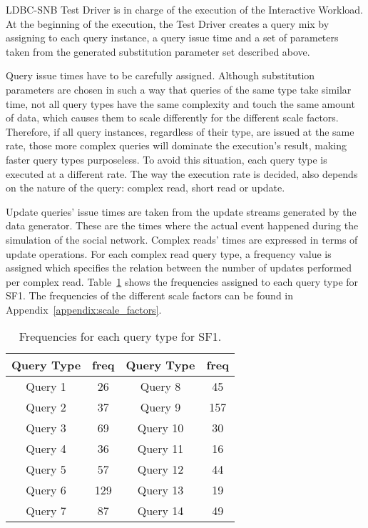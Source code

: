 
LDBC-SNB Test Driver is in charge of the execution of the Interactive Workload.
At the beginning of the execution, the Test Driver creates a query mix by
assigning to each query instance, a query issue time and a set of parameters
taken from the generated substitution parameter set described above.  

Query issue times have to be carefully assigned.  Although substitution
parameters are chosen in such a way that queries of the same type take similar
time, not all query types have the same complexity and touch the same amount of
data, which causes them to scale differently for the different scale factors.
Therefore, if all query instances, regardless of their type, are issued
at the same rate, those more complex queries will dominate the execution's
result, making faster query types purposeless. To avoid this situation, each
query type is executed at a different rate. The way the execution rate is decided,
also depends on the nature of the query: complex read, short read or update.

Update queries' issue times are taken from the update streams generated by the
data generator. These are the times where the actual event happened during the
simulation of the social network. Complex reads' times are expressed in terms
of update operations. For each complex read query type, a frequency value is
assigned which specifies the relation between the number of updates performed
per complex read.  Table~\ref{table:freqs} shows the frequencies assigned to
each query type for SF1. The frequencies of the different scale factors can be
found in Appendix~\ref{appendix:scale_factors}.

\begin{table}[H]
\centering
    \begin{tabular}{|c|c|c|c|}
    \hline
    Query Type & freq & Query Type & freq \\ 
    \hline
    \hline
    Query 1 & 26 & Query 8 & 45 \\ 
    \hline       
    Query 2 & 37 & Query 9 & 157 \\  
    \hline        
    Query 3 & 69 & Query 10 & 30 \\ 
    \hline        
    Query 4 & 36 & Query 11 & 16 \\ 
    \hline        
    Query 5 & 57 & Query 12 & 44 \\ 
    \hline        
    Query 6 & 129 & Query 13 & 19 \\  
    \hline        
    Query 7 & 87 & Query 14 & 49 \\ 
    \hline
    \end{tabular}
    \caption{Frequencies for each query type for SF1.}
    \label{table:freqs}
\end{table}

